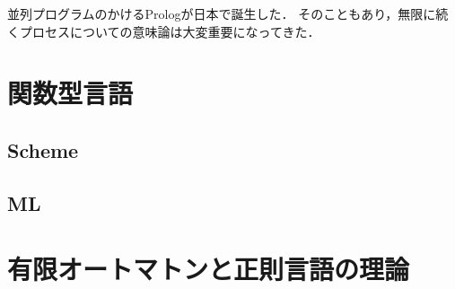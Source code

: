 \documentclass[uplatex, dvipdfmx]{jsreport}
\begin{document}
並列プログラムのかけるPrologが日本で誕生した．
そのこともあり，無限に続くプロセスについての意味論は大変重要になってきた．

\chapter{関数型言語}

\section{Scheme}

\section{ML}

\chapter{有限オートマトンと正則言語の理論}
\end{document}
